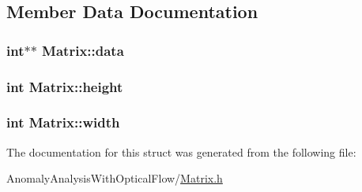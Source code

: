 \subsection{Member Data Documentation}
\hypertarget{struct_matrix_afda04dbb307a169b4235dba98fb5b9df}{
\subsubsection[{data}]{\setlength{\rightskip}{0pt plus 5cm}int$\ast$$\ast$ Matrix\+::data}}\label{struct_matrix_afda04dbb307a169b4235dba98fb5b9df}
\hypertarget{struct_matrix_a0b5614256a04ece0ea54b8aad7e6980c}{
\subsubsection[{height}]{\setlength{\rightskip}{0pt plus 5cm}int Matrix\+::height}}\label{struct_matrix_a0b5614256a04ece0ea54b8aad7e6980c}
\hypertarget{struct_matrix_ad4320bd2dc03fd11887d3ba350c6c8ef}{
\subsubsection[{width}]{\setlength{\rightskip}{0pt plus 5cm}int Matrix\+::width}}\label{struct_matrix_ad4320bd2dc03fd11887d3ba350c6c8ef}


The documentation for this struct was generated from the following file\+:\begin{DoxyCompactItemize}
\item 
Anomaly\+Analysis\+With\+Optical\+Flow/\hyperlink{_matrix_8h}{Matrix.\+h}\end{DoxyCompactItemize}
